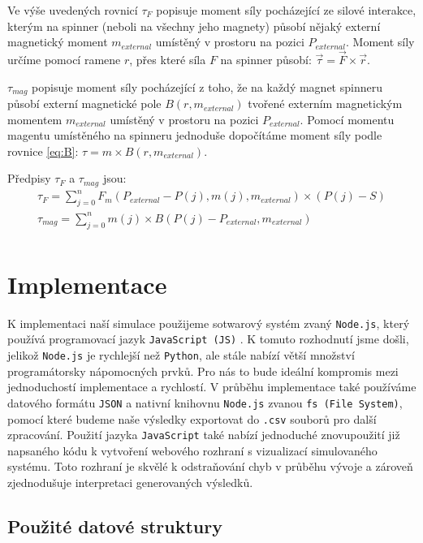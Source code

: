 \documentclass[12pt, a4paper,
 twoside,        %
 openright
]{report}
\begin{document}
Ve výše uvedených rovnicí $\tau_F$ popisuje moment síly pocházející ze silové interakce, kterým na spinner (neboli na všechny jeho magnety) působí nějaký externí magnetický moment $m_{external}$ umístěný v prostoru na pozici $P_{external}$. Moment síly určíme pomocí ramene $r$, přes které síla $F$ na spinner působí: $\vec{\tau} = \vec{F} \times \vec{r}$.

$\tau_{mag}$ popisuje moment síly pocházející z toho, že na každý magnet spinneru působí externí magnetické pole $B(r, m_{external})$ tvořené externím magnetickým momentem $m_{external}$ umístěný v prostoru na pozici $P_{external}$. Pomocí momentu magentu umístěného na spinneru jednoduše dopočítáme moment síly podle rovnice \ref{eq:B}: $\tau = m \times B(r, m_{external})$.

Předpisy $\tau_F$ a $\tau_{mag}$ jsou:
\begin{equation}
    \label{eq:sim_equations2}
    \begin{gathered}
        \tau_F = \sum_{j=0}^{n} F_m(P_{external}- P(j), m(j), m_{external}) \times (P(j) - S)\\
        \tau_{mag} = \sum_{j=0}^{n} m(j) \times B(P(j)-P_{external},m_{external})\\
    \end{gathered}
\end{equation}

\section{Implementace}
K implementaci naší simulace použijeme sotwarový systém zvaný \texttt{Node.js}, který používá programovací jazyk \texttt{JavaScript (JS)} \cite{JS}. K tomuto rozhodnutí jsme došli, jelikož \texttt{Node.js} je rychlejší než \texttt{Python}, ale stále nabízí větší množství programátorsky nápomocných prvků. Pro nás to bude ideální kompromis mezi jednoduchostí implementace a rychlostí. V průběhu implementace také používáme datového formátu \texttt{JSON} \cite{JSON} a nativní knihovnu \texttt{Node.js} zvanou \texttt{fs (File System)}, pomocí které budeme naše výsledky exportovat do \texttt{.csv} souborů pro další zpracování. Použití jazyka \texttt{JavaScript} také nabízí jednoduché znovupoužití již napsaného kódu k vytvoření webového rozhraní s vizualizací simulovaného systému. Toto rozhraní je skvělé k odstraňování chyb v průběhu vývoje a zároveň zjednodušuje interpretaci generovaných výsledků.

\subsection{Použité datové struktury}
\end{document}
